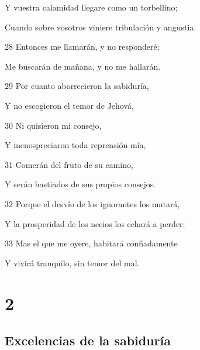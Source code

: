 \par Y vuestra calamidad llegare como un torbellino;
\par Cuando sobre vosotros viniere tribulación y angustia.
\par 28 Entonces me llamarán, y no responderé;
\par Me buscarán de mañana, y no me hallarán.
\par 29 Por cuanto aborrecieron la sabiduría,
\par Y no escogieron el temor de Jehová,
\par 30 Ni quisieron mi consejo,
\par Y menospreciaron toda reprensión mía,
\par 31 Comerán del fruto de su camino,
\par Y serán hastiados de sus propios consejos.
\par 32 Porque el desvío de los ignorantes los matará,
\par Y la prosperidad de los necios los echará a perder;
\par 33 Mas el que me oyere, habitará confiadamente
\par Y vivirá tranquilo, sin temor del mal.

\chapter{2}

\section*{Excelencias de la sabiduría}


